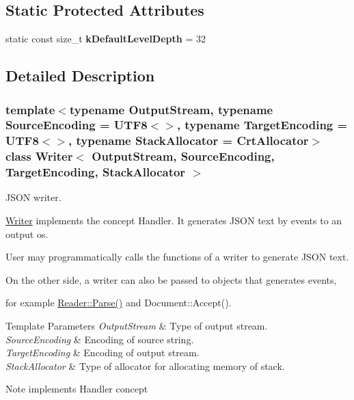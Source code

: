 \subsection*{Static Protected Attributes}
\begin{DoxyCompactItemize}
\item 
\mbox{\label{classWriter_a14f0c1dde0474dc531b325db66c9df38}} 
static const size\+\_\+t {\bfseries k\+Default\+Level\+Depth} = 32
\end{DoxyCompactItemize}


\subsection{Detailed Description}
\subsubsection*{template$<$typename Output\+Stream, typename Source\+Encoding = U\+T\+F8$<$$>$, typename Target\+Encoding = U\+T\+F8$<$$>$, typename Stack\+Allocator = Crt\+Allocator$>$\newline
class Writer$<$ Output\+Stream, Source\+Encoding, Target\+Encoding, Stack\+Allocator $>$}

J\+S\+ON writer. 

\hyperlink{classWriter}{Writer} implements the concept Handler. It generates J\+S\+ON text by events to an output os.

User may programmatically calls the functions of a writer to generate J\+S\+ON text.

On the other side, a writer can also be passed to objects that generates events,

for example \hyperlink{classGenericReader_a0c450620d14ff1824e58bb7bd9b42099}{Reader\+::\+Parse()} and Document\+::\+Accept().


\begin{DoxyTemplParams}{Template Parameters}
{\em Output\+Stream} & Type of output stream. \\
\hline
{\em Source\+Encoding} & Encoding of source string. \\
\hline
{\em Target\+Encoding} & Encoding of output stream. \\
\hline
{\em Stack\+Allocator} & Type of allocator for allocating memory of stack. \\
\hline
\end{DoxyTemplParams}
\begin{DoxyNote}{Note}
implements Handler concept 
\end{DoxyNote}



